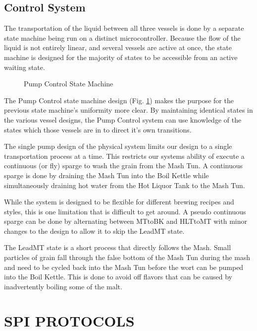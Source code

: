 \documentclass[letterpaper, 10 pt, conference]{ieeeconf}  %
\begin{document}
\subsection{Control System}

The transportation of the liquid between all three vessels is done by a separate state machine being run on a distinct microcontroller. Because the flow of the liquid is not entirely linear, and several vessels are active at once, the state machine is designed for the majority of states to be accessible from an active waiting state.

\begin{figure}[!htb]
  \centering
  
  \caption{Pump Control State Machine}
  \label{sm:valves}
\end{figure}

The Pump Control state machine design (Fig. \ref{sm:valves}) makes the purpose for the previous state machine's uniformity more clear. By maintaining identical states in the various vessel designs, the Pump Control system can use knowledge of the states which those vessels are in to direct it's own transitions.

The single pump design of the physical system limits our design to a single transportation process at a time. This restricts our systems ability of execute a continuous (or fly) sparge to wash the grain from the Mash Tun. A continuous sparge is done by draining the Mash Tun into the Boil Kettle while simultaneously draining hot water from the Hot Liquor Tank to the Mash Tun.

While the system is designed to be flexible for different brewing recipes and styles, this is one limitation that is difficult to get around. A pseudo continuous sparge can be done by alternating between MTtoBK and HLTtoMT with minor changes to the design to allow it to skip the LeadMT state.

The LeadMT state is a short process that directly follows the Mash. Small particles of grain fall through the false bottom of the Mash Tun during the mash and need to be cycled back into the Mash Tun before the wort can be pumped into the Boil Kettle. This is done to avoid off flavors that can be caused by inadvertently boiling some of the malt.

\section{SPI PROTOCOLS}
\end{document}
